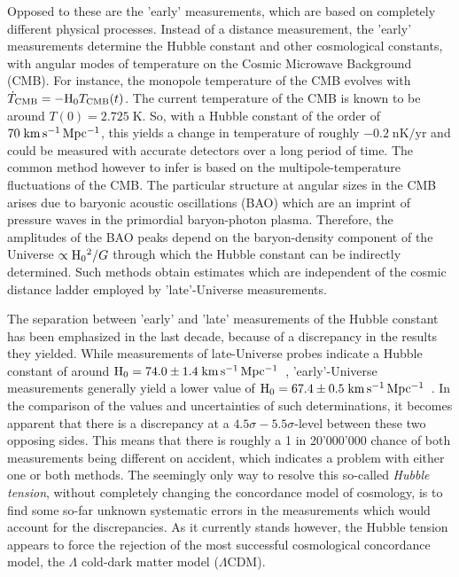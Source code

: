Opposed to these are the 'early' measurements, which are based on completely
different physical processes.  Instead of a distance measurement, the 'early'
measurements determine the Hubble constant and other cosmological constants,
with angular modes of temperature on the Cosmic Microwave Background (CMB).  For
instance, the monopole temperature of the CMB evolves with $\dot{T}_{\text{CMB}}
= -\mathrm{H_{0}}{}T_{\text{CMB}}(t)$.  The current temperature of the CMB is known to be
around $T(0) = 2.725\;\mathrm{K}$. So, with a Hubble constant of the order of
$70\;\mathrm{km\,s^{-1}\,Mpc^{-1}}{}$, this yields a change in temperature of roughly
$-0.2\;\mathrm{nK/yr}$ and could be measured with accurate detectors over a long
period of time.  The common method however to infer \Ho{} is based on the
multipole-temperature fluctuations of the CMB.  The particular structure at
angular sizes in the CMB arises due to baryonic acoustic oscillations (BAO)
which are an imprint of pressure waves in the primordial baryon-photon plasma.
Therefore, the amplitudes of the BAO peaks depend on the baryon-density
component of the Universe $\propto\mathrm{H_{0}}{}^{2}/G$ through which the Hubble constant
can be indirectly determined.  Such methods obtain estimates which are
independent of the cosmic distance ladder employed by 'late'-Universe
measurements.

The separation between 'early' and 'late' measurements of the Hubble constant
has been emphasized in the last decade, because of a discrepancy in the results
they yielded.  While measurements of late-Universe probes indicate a Hubble
constant of around $\mathrm{H_{0}} = 74.0 \pm 1.4\;\mathrm{km\,s^{-1}\,Mpc^{-1}}$~, 'early'-Universe
measurements generally yield a lower value of $\mathrm{H_{0}} = 67.4 \pm
0.5\;\mathrm{km\,s^{-1}\,Mpc^{-1}}$~.  In the comparison of the
values and uncertainties of such determinations, it becomes apparent that there
is a discrepancy at a $4.5\sigma-5.5\sigma$-level between these two opposing sides.  This means
that there is roughly a 1 in 20'000'000 chance of both measurements being
different on accident, which indicates a problem with either one or both
methods.  The seemingly only way to resolve this so-called \textit{Hubble
tension}, without completely changing the concordance model of cosmology, is to
find some so-far unknown systematic errors in the measurements which would
account for the discrepancies.  As it currently stands however, the Hubble
tension appears to force the rejection of the most successful cosmological
concordance model, the $\Lambda$ cold-dark matter model ($\Lambda$CDM). 

